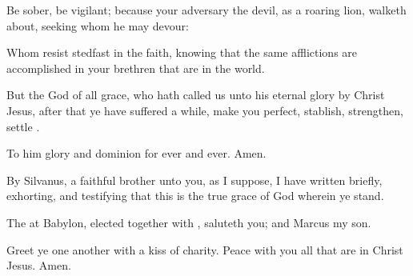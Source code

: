 {Be
sober, be
vigilant;
because
your
adversary the
devil,
as a
roaring
lion, walketh
about,
seeking
whom he may
devour:

Whom
resist
stedfast in the
faith, knowing
that the
same
afflictions are
accomplished in
your
brethren that are
in the
world.

But the
God of
all
grace,
who hath
called
us
unto
his
eternal
glory
by
Christ
Jesus, after that ye have
suffered a
while,
make
you
perfect,
stablish,
strengthen,
settle
{}.

To
him
{}
glory
and
dominion
for
ever and
ever.
Amen.


\par }{\PP {}By
Silvanus, a
faithful
brother unto
you,
as I
suppose, I have
written
briefly,
exhorting,
and
testifying that
this
is the
true
grace of
God
wherein ye
stand.

The
{}
at
Babylon, elected together
with
{},
saluteth
you;
and
{}
Marcus
my
son.

Greet
ye one
another
with a
kiss of
charity.
Peace
{} with
you
all
that are
in
Christ
Jesus.
Amen.


\par }
